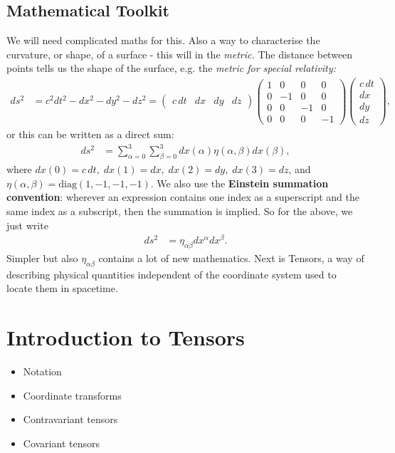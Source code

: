 \documentclass[a4paper, 11pt, normalem]{report}
\begin{document}
\section{Mathematical Toolkit}
We will need complicated maths for this. 
Also a way to characterise the curvature, or shape, of a surface - this will in the \emph{metric.}
The distance between points tells us the shape of the surface, e.g. the \emph{metric for special relativity:}
\begin{align}
    ds^2 &= c^2dt^2-dx^2-dy^2-dz^2 = \begin{pmatrix} c\,dt & dx & dy & dz \end{pmatrix}\begin{pmatrix} 1 & 0 & 0 & 0 \\ 0 & -1 & 0 & 0 \\ 0 & 0 & -1 & 0 \\ 0 & 0 & 0 & -1 \end{pmatrix}\begin{pmatrix} c\,dt \\ dx \\ dy \\ dz\end{pmatrix},
\end{align}
or this can be written as a direct sum:
\begin{align}
    ds^2 &= \sum_{\alpha=0}^3 \sum_{\beta=0}^3 dx(\alpha)\eta(\alpha,\beta)dx(\beta),
\end{align}
where $dx(0)=c\,dt,\; dx(1)=dx,\; dx(2)=dy,\; dx(3)=dz$, and $\eta(\alpha,\beta)=\text{diag}(1,-1,-1,-1)$.
We also use the \textbf{Einstein summation convention}: wherever an expression contains one index as a superscript and the same index as a subscript, then the summation is implied. 
So for the above, we just write
\begin{align}
    ds^2 &= \eta_{\alpha\beta}dx^\alpha dx^\beta.
\end{align}
Simpler but also $\eta_{\alpha\beta}$ contains a lot of new mathematics. 
Next is Tensors, a way of describing physical quantities independent of the coordinate system used to locate them in spacetime.


\chapter{Introduction to Tensors}
\begin{itemize}
    \item Notation
    \item Coordinate transforms
    \item Contravariant tensors
    \item Covariant tensors
\end{itemize}
\end{document}
